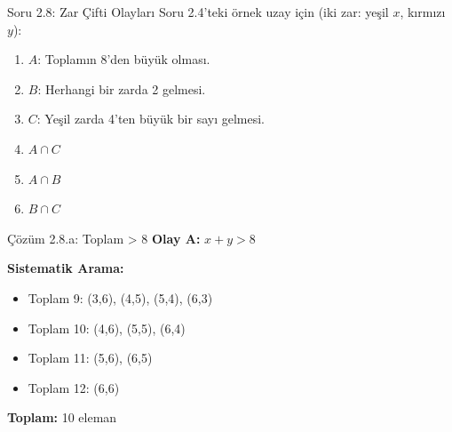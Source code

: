 \documentclass[light]{lutbeamer}
\begin{document}
\begin{frame}{Soru 2.8: Zar Çifti Olayları}
    Soru 2.4'teki örnek uzay için (iki zar: yeşil $x$, kırmızı $y$):
    \begin{enumerate}
        \item $A$: Toplamın 8'den büyük olması.
        \item $B$: Herhangi bir zarda 2 gelmesi.
        \item $C$: Yeşil zarda 4'ten büyük bir sayı gelmesi.
        \item $A \cap C$
        \item $A \cap B$
        \item $B \cap C$
    \end{enumerate}
\end{frame}

\begin{frame}{Çözüm 2.8.a: Toplam > 8}
    \color{blue}
    \textbf{Olay A: } $x + y > 8$
    
    \vspace{0.3cm}
    \textbf{Sistematik Arama:}
    \begin{itemize}
        \item Toplam 9: (3,6), (4,5), (5,4), (6,3)
        \item Toplam 10: (4,6), (5,5), (6,4)
        \item Toplam 11: (5,6), (6,5)
        \item Toplam 12: (6,6)
    \end{itemize}
    
    \vspace{0.3cm}
    \begin{center}
    \end{center}
    
    \textbf{Toplam:} 10 eleman
\end{frame}
\end{document}
